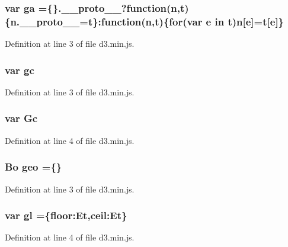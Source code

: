 \subsubsection[{ga}]{\setlength{\rightskip}{0pt plus 5cm}var ga =\{\}.\+\_\+\+\_\+proto\+\_\+\+\_\+?function({\bf n},t)\{n.\+\_\+\+\_\+proto\+\_\+\+\_\+=t\}\+:function({\bf n},t)\{{\bf for}(var {\bf e} in t){\bf n}[{\bf e}]=t[{\bf e}]\}}\label{d3_8min_8js_af4217fde2e00fe99613f3730491dc564}


Definition at line 3 of file d3.\+min.\+js.

\subsubsection[{gc}]{\setlength{\rightskip}{0pt plus 5cm}var gc}\label{d3_8min_8js_a908fb789d71bbb4523948ce4dc72ae07}


Definition at line 3 of file d3.\+min.\+js.

\subsubsection[{Gc}]{\setlength{\rightskip}{0pt plus 5cm}var Gc}\label{d3_8min_8js_a6b95e7910f81ca686ab5f75ef240b6b8}


Definition at line 4 of file d3.\+min.\+js.

\subsubsection[{geo}]{ {\bf Bo} geo =\{\}}\label{d3_8min_8js_a7832b5389b261b7169c7c58f33e63fb7}


Definition at line 3 of file d3.\+min.\+js.

\subsubsection[{gl}]{\setlength{\rightskip}{0pt plus 5cm}var gl =\{floor\+:\+Et,ceil\+:\+Et\}}\label{d3_8min_8js_ac073c982f25059138823f2cb600ddb78}


Definition at line 4 of file d3.\+min.\+js.

